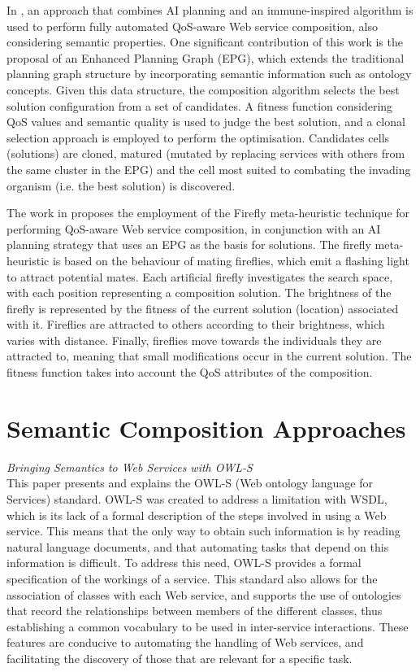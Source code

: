 In \cite{pop2010immune}, an approach that combines AI planning and an immune-inspired algorithm is used to perform fully automated QoS-aware Web service composition, also considering
semantic properties. One significant contribution of this work is the proposal of an Enhanced Planning Graph (EPG), which extends the traditional planning graph structure
by incorporating semantic information such as ontology concepts. Given this data structure, the composition algorithm selects the best solution configuration from a set of candidates. A fitness function considering QoS values and semantic quality is used to judge the best solution, and a clonal selection approach is employed to perform the optimisation. Candidates cells (solutions) are cloned, matured (mutated by replacing services with others from the same cluster in the EPG) and the cell most suited to combating the invading organism (i.e. the best solution) is discovered.

The work in \cite{pop2011hybrid} proposes the employment of the Firefly meta-heuristic technique for performing QoS-aware Web service composition, in conjunction with an AI planning strategy that uses an EPG as the basis for solutions. The firefly meta-heuristic is based on the behaviour of mating fireflies, which emit a flashing light to attract potential mates. Each artificial firefly investigates the search space, with each position representing a composition solution. The brightness of the firefly is represented by the fitness of the current solution (location) associated with it. Fireflies are attracted to others according to their brightness, which varies with distance. Finally, fireflies move towards the individuals they are attracted to, meaning that small modifications occur in the current solution. The fitness function takes into account the QoS attributes of the composition.

\section{Semantic Composition Approaches}
\textit{Bringing Semantics to Web Services with OWL-S \cite{martin2007bringing}}\\
This paper presents and explains the OWL-S (Web ontology language for Services) standard. OWL-S
was created to address a limitation with WSDL, which is its lack of a formal description of the
steps involved in using a Web service. This means that the only way to obtain such information
is by reading natural language documents, and that automating tasks that depend on this information
is difficult. To address this need, OWL-S provides a formal specification of the workings of a service.
This standard also allows for the association of classes with each Web service, and supports the use
of ontologies that record the relationships between members of the different classes, thus establishing
a common vocabulary to be used in inter-service interactions. These features are conducive to automating
the handling of Web services, and facilitating the discovery of those that are relevant for a specific
task.

